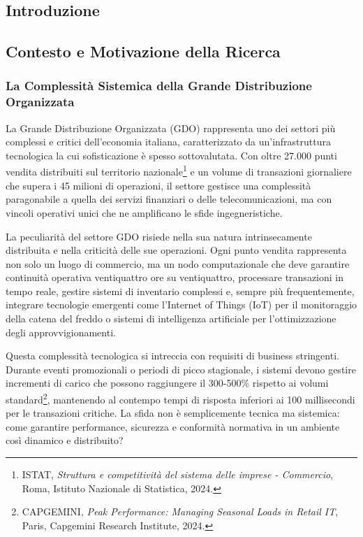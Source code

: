 \begin{bibunit}[IEEEtran]
\chapter{Introduzione}

\section{Contesto e Motivazione della Ricerca}

\subsection{La Complessità Sistemica della Grande Distribuzione Organizzata}

La Grande Distribuzione Organizzata (GDO) rappresenta uno dei settori più complessi e critici dell'economia italiana, caratterizzato da un'infrastruttura tecnologica la cui sofisticazione è spesso sottovalutata. Con oltre 27.000 punti vendita distribuiti sul territorio nazionale\footnote{ISTAT, \textit{Struttura e competitività del sistema delle imprese - Commercio}, Roma, Istituto Nazionale di Statistica, 2024.} e un volume di transazioni giornaliere che supera i 45 milioni di operazioni, il settore gestisce una complessità paragonabile a quella dei servizi finanziari o delle telecomunicazioni, ma con vincoli operativi unici che ne amplificano le sfide ingegneristiche.

La peculiarità del settore GDO risiede nella sua natura intrinsecamente distribuita e nella criticità delle sue operazioni. Ogni punto vendita rappresenta non solo un luogo di commercio, ma un nodo computazionale che deve garantire continuità operativa ventiquattro ore su ventiquattro, processare transazioni in tempo reale, gestire sistemi di inventario complessi e, sempre più frequentemente, integrare tecnologie emergenti come l'Internet of Things (IoT) per il monitoraggio della catena del freddo o sistemi di intelligenza artificiale per l'ottimizzazione degli approvvigionamenti.

Questa complessità tecnologica si intreccia con requisiti di business stringenti. Durante eventi promozionali o periodi di picco stagionale, i sistemi devono gestire incrementi di carico che possono raggiungere il 300-500\% rispetto ai volumi standard\footnote{CAPGEMINI, \textit{Peak Performance: Managing Seasonal Loads in Retail IT}, Paris, Capgemini Research Institute, 2024.}, mantenendo al contempo tempi di risposta inferiori ai 100 millisecondi per le transazioni critiche. La sfida non è semplicemente tecnica ma sistemica: come garantire performance, sicurezza e conformità normativa in un ambiente così dinamico e distribuito?


\end{bibunit}
